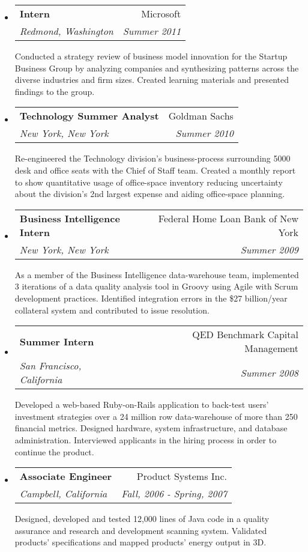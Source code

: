 \documentclass[letterpaper,1opt]{article}
\makeatletter
\newlength{\outerbordwidth}
\newcommand{\resheading}[1]{\vspace{8pt}
  \parbox{\textwidth}{\setlength{\FrameSep}{\outerbordwidth}
    \begin{shaded}
\setlength{\fboxsep}{0pt}\framebox[\textwidth][l]{\setlength{\fboxsep}{4pt}\fcolorbox{shadecolorB}{shadecolorB}{\textbf{\sffamily{\mbox{~}\makebox[6.762in][l]{\large #1} \vphantom{p\^{E}}}}}}
    \end{shaded}
  }\vspace{-5pt}
}
\newcommand{\jobheading}[4]{
\begin{tabular*}{6.5in}{l@{\cftdotfill{\cftsecdotsep}\extracolsep{\fill}}r}
		\textbf{#1} & #2 \\
		\textit{#3} & \textit{#4} \\
\end{tabular*}\vspace{-6pt}}
\makeatother
\begin{document}

		\resheading{Employment}


		\begin{itemize}
		\item \jobheading{Intern}{Microsoft}{Redmond, Washington}{Summer 2011}
			Conducted a strategy review of business model innovation for the Startup Business Group by analyzing companies and synthesizing patterns across the diverse industries and firm sizes. Created learning materials and presented findings to the group.

		\item \jobheading{Technology Summer Analyst}{Goldman Sachs}{New York, New York}{Summer 2010}
			Re-engineered the Technology division’s business-process surrounding 5000 desk and office seats with the Chief of Staff team. Created a monthly report to show quantitative usage of office-space inventory reducing uncertainty about the division’s 2nd largest expense and aiding office-space planning.

		\item \jobheading{Business Intelligence Intern}{Federal Home Loan Bank of New York}{New York, New York}{Summer 2009}
			As a member of the Business Intelligence data-warehouse team, implemented 3 iterations of a data quality analysis tool in Groovy using Agile with Scrum development practices. Identified integration errors in the \$27 billion/year collateral system and contributed to issue resolution. 

		\item \jobheading{Summer Intern}{QED Benchmark Capital Management}{San Francisco, California}{Summer 2008}
			Developed a web-based Ruby-on-Rails application to back-test users’ investment strategies over a 24 million row data-warehouse of more than 250 financial metrics. Designed hardware, system infrastructure, and database administration. Interviewed applicants in the hiring process in order to continue the product. 

		\item \jobheading{Associate Engineer}{Product Systems Inc.}{Campbell, California}{Fall, 2006 - Spring, 2007}
			Designed, developed and tested 12,000 lines of Java code in a quality assurance and research and development scanning system. Validated products’ specifications and mapped products’ energy output in 3D. 

		\end{itemize}
		
\end{document}
